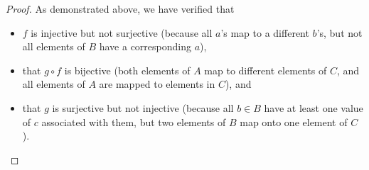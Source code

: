 \documentclass[12pt,oneside]{amsart}
\theoremstyle{remark}
\begin{document}
\begin{proof}
As demonstrated above, we have verified that
\begin{itemize}
  \item $f$ is injective but not surjective (because all $a$'s map to a different $b$'s, but not all elements of $B$ have a corresponding $a$),
  \item that $g \circ f$ is bijective (both elements of $A$ map to different elements of $C$, and all elements of $A$ are mapped to elements in $C$), and
  \item that $g$ is surjective but not injective (because all $b \in B$ have at least one value of $c$ associated with them, but two elements of $B$ map onto one element of $C$).
\end{itemize}
\end{proof}
\end{document}
